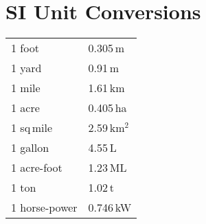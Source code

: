 \section*{SI Unit Conversions}

\begin{tabular}{ll}
	1 foot		& 0.305\,m \\
	1 yard		& 0.91\,m  \\
	1 mile		& 1.61\,km \\
	1 acre		& 0.405\,ha \\
	1 sq\,mile	& 2.59\,km$^2$ \\
	1 gallon	& 4.55\,L \\
	1 acre-foot	& 1.23\,ML \\
	1 ton		& 1.02\,t \\
	1 horse-power	& 0.746\,kW \\
\end{tabular}

